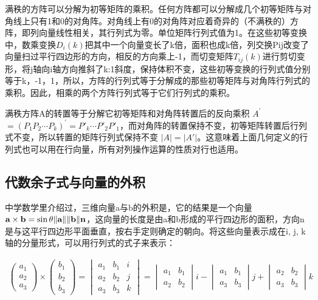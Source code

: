 	满秩的方阵可以分解为初等矩阵的乘积。任何方阵都可以分解成几个初等矩阵与对角线上只有1和0的对角阵。对角线上有0的对角阵对应着奇异的（不满秩的）方阵，即列向量线性相关，其行列式为零。单位矩阵行列式值为1。在这些初等变换中，数乘变换$ D_i(k) $把其中一个向量变长了k倍，面积也成k倍，列交换Pij改变了向量扫过平行四边形的方向，相反的方向乘上-1，而切变矩阵$ T_{ij}(k) $进行剪切变形，将j轴向i轴方向推斜了k:1斜度，保持体积不变，这些初等变换的行列式值分别等于k，-1，1，所以，方阵的行列式等于分解成的那些初等矩阵与对角阵行列式的乘积。因此，相乘的两个方阵行列式等于它们行列式的乘积。
	
	满秩方阵A的转置等于分解它初等矩阵和对角阵转置后的反向乘积 $ A^{'} $  $= (P_1 P_2\cdots P_k)^{'} = P'_k\cdots P'_2 P'_1 $，而对角阵的转置保持不变，初等矩阵转置后行列式不变，所以转置的矩阵行列式保持不变
	$ \left| A \right| = \left| {A'} \right| $。这意味着上面几何定义的行列式也可以用在行向量，所有对列操作运算的性质对行也适用。
	
	
	
	\subsection{代数余子式与向量的外积}
	
	中学数学里介绍过，三维向量a与b的外积是，它的结果是一个向量$ \textbf a \times \textbf b = \sin \theta \|\textbf a\|\|\textbf b \| \textbf n $，这向量的长度是由a和b形成的平行四边形的面积，方向n是与这平行四边形平面垂直，按右手定则确定的朝向。将这些向量表示成在i, j, k轴的分量形式，可以用行列式的式子来表示：
	
	\begin{gather*}
		\begin{pmatrix}a_1\\a_2\\a_3 \end{pmatrix} \times \begin{pmatrix}b_1\\b_2\\b_3 \end{pmatrix}= \begin{vmatrix}a_1&b_1&i \\a_2& b_2&j\\a_3&b_3&k \end{vmatrix} = \begin{vmatrix}a_1&b_1 \\a_2& b_2 \end{vmatrix}i - \begin{vmatrix}a_1&b_1 \\a_3&b_3 \end{vmatrix}j + \begin{vmatrix}a_2& b_2\\a_3&b_3 \end{vmatrix}k
	\end{gather*}

